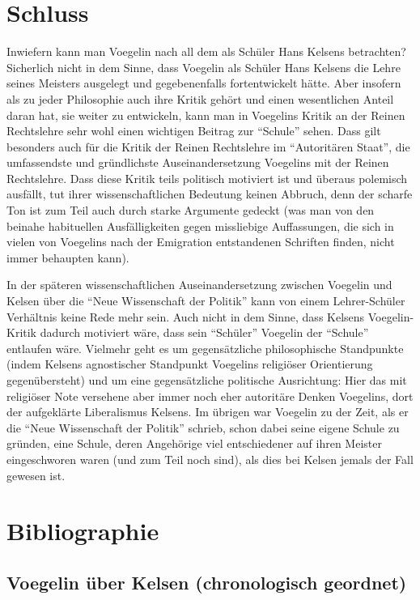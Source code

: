 \documentclass[12pt,a4paper,ngerman]{article}
\begin{document}
\section{Schluss}

Inwiefern kann man Voegelin nach all dem als Schüler Hans Kelsens betrachten?
Sicherlich nicht in dem Sinne, dass Voegelin als Schüler Hans Kelsens die
Lehre seines Meisters ausgelegt und gegebenenfalls fortentwickelt hätte. Aber
insofern als zu jeder Philosophie auch ihre Kritik gehört und einen
wesentlichen Anteil daran hat, sie weiter zu entwickeln, kann man in Voegelins
Kritik an der Reinen Rechtslehre sehr wohl einen wichtigen Beitrag zur
"`Schule"' sehen. Dass gilt besonders auch für die Kritik der Reinen
Rechtslehre im "`Autoritären Staat"', die umfassendste und gründlichste
Auseinandersetzung Voegelins mit der Reinen Rechtslehre. Dass diese Kritik
teils politisch motiviert ist und überaus polemisch ausfällt, tut ihrer
wissenschaftlichen Bedeutung keinen Abbruch, denn der scharfe Ton ist zum Teil
auch durch starke Argumente gedeckt (was man von den beinahe habituellen
Ausfälligkeiten gegen missliebige Auffassungen, die sich in vielen von
Voegelins nach der Emigration entstandenen Schriften finden, nicht immer
behaupten kann).

In der späteren wissenschaftlichen Auseinandersetzung zwischen
Voegelin und Kelsen über die "`Neue Wissenschaft der Politik"' kann
von einem Lehrer-Schüler Verhältnis keine Rede mehr sein. Auch nicht
in dem Sinne, dass Kelsens Voegelin-Kritik dadurch motiviert wäre,
dass sein "`Schüler"' Voegelin der "`Schule"' entlaufen wäre. Vielmehr
geht es um gegensätzliche philosophische Standpunkte (indem Kelsens
agnostischer Standpunkt Voegelins religiöser Orientierung
gegenübersteht) und um eine gegensätzliche politische Ausrichtung:
Hier das mit religiöser Note versehene aber immer noch eher
autoritäre Denken Voegelins, dort der aufgeklärte Liberalismus
Kelsens. Im übrigen war Voegelin zu der Zeit, als er die "`Neue
Wissenschaft der Politik"' schrieb, schon dabei seine eigene Schule zu
gründen, eine Schule, deren Angehörige viel entschiedener auf ihren
Meister eingeschworen waren (und zum Teil noch sind), als dies bei
Kelsen jemals der Fall gewesen ist.

\newpage

\section{Bibliographie}

\subsection{Voegelin über Kelsen (chronologisch geordnet)}
\end{document}
